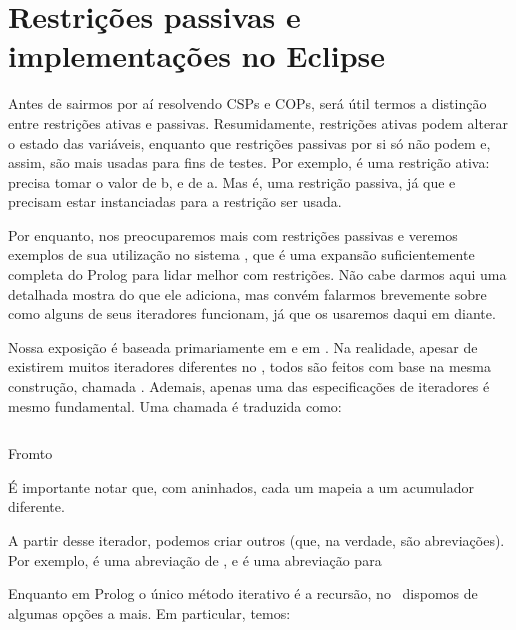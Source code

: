 \documentclass{article}
\begin{document}
\section{Restrições passivas e implementações no Eclipse}

Antes de sairmos por aí resolvendo CSPs e COPs, será útil termos a
distinção entre restrições ativas e passivas. Resumidamente,
restrições ativas podem alterar o estado das variáveis, enquanto que
restrições passivas por si só não podem e, assim, são mais usadas para
fins de testes. Por exemplo,  é uma restrição
ativa:  precisa tomar o valor de b, e  de a. Mas
 é, uma restrição passiva, já que  e 
precisam estar instanciadas para a restrição ser usada.

Por enquanto, nos preocuparemos mais com restrições passivas e veremos
exemplos de sua utilização no sistema \eclipse, que é uma expansão
suficientemente completa do Prolog para lidar melhor com
restrições. Não cabe darmos aqui uma detalhada mostra do que ele
adiciona, mas convém falarmos brevemente sobre como alguns de seus
iteradores funcionam, já que os usaremos daqui em diante.

Nossa exposição é baseada primariamente em \cite{joachim} e em
\cite{schimpf}. Na realidade, apesar de existirem muitos iteradores
diferentes no \eclipse, todos são feitos com base na mesma construção,
chamada . Ademais, apenas uma das especificações de
iteradores é mesmo fundamental. Uma chamada  é traduzida como:

\begin{listing}
  \inputminted{prolog}{../Exemplos/Cap8/prog8_fromto.pl}
  \caption{Fromto}
\end{listing}

\noindent É importante notar que, com  aninhados,
cada um mapeia a um acumulador diferente.

A partir desse iterador, podemos criar outros (que, na verdade, são
abreviações). Por exemplo,  é
uma abreviação de ,
e  é uma abreviação para 


Enquanto em Prolog o único método iterativo é a recursão, no
\eclipse\ dispomos de algumas opções a mais. Em particular, temos:
\end{document}
